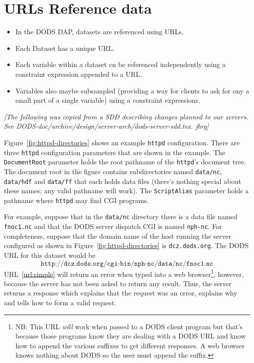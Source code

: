 \documentclass{article}
\newcommand{\httpd}{\texttt{httpd}\xspace}
\begin{document}
\section{URLs Reference data}
\label{sec:URLs}

\begin{itemize}
\item In the DODS DAP, datasets are referenced using URLs. 

\item Each Dataset has a unique URL.

\item Each variable within a dataset cn be referenced independently using a
constraint expression appended to a URL.

\item Variables also maybe subsampled (providing a way for clients to ask for
  ony a small part of a single variable) using a constraint expressions.
\end{itemize}

\emph{[The following was copied from a SDD describing changes planned to our
  servers.  See DODS-doc/archive/design/server-arch/dods-server-sdd.tex.
  jhrg]}

Figure~\ref{fig:httpd-directories} shows an example \httpd configuration.
There are three \httpd configuration parameters that are shown in the
example.  The \texttt{DocumentRoot} parameter holds the root pathname of the
\httpd's document tree. The document root in the figure contains
subdirectories named \texttt{data/nc}, \texttt{data/hdf} and \texttt{data/ff}
that each holds data files (there's nothing special about these names;
any valid pathname will work).  The \texttt{ScriptAlias} parameter holds a
pathname where \httpd may find CGI programs.

For example, suppose that in the \texttt{data/nc} directory there is a data
file named \texttt{fnoc1.nc} and that the DODS server dispatch CGI is named
\texttt{nph-nc}.  For completeness, suppose that the domain name of the host
running the server configured as shown in Figure~\ref{fig:httpd-directories}
is \texttt{dcz.dods.org}. The DODS URL for this dataset would be
\begin{equation}
\texttt{http://dcz.dods.org/cgi-bin/nph-nc/data/nc/fnoc1.nc}
\label{url:simple}
\end{equation}
URL~\ref{url:simple} will return an error when typed into a web
browser\footnote{NB: This URL \emph{will} work when passed to a DODS client
  program but that's because those programs know they are dealing with a DODS
  URL and know how to append the various suffixes to get different responses.
  A web browser knows nothing about DODS so the user must append the
  suffix.}, however, because the server has not been asked to return any
result. Thus, the server returns a response which explains that the request
was an error, explains why and tells how to form a valid request.
\end{document}
